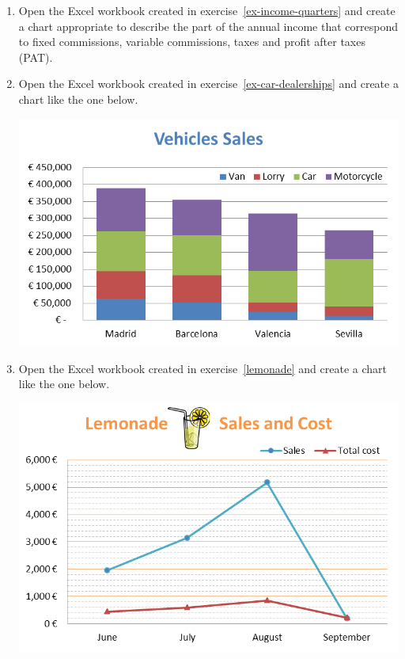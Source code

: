 \begin{enumerate}[leftmargin=*,resume]
\item Open the Excel workbook created in exercise~\ref{ex-income-quarters} and create a chart appropriate to describe
the part of the annual income that correspond to fixed commissions, variable commissions, taxes and profit after taxes
(PAT).

\item Open the Excel workbook created in exercise~\ref{ex-car-dealerships} and create a chart like the one below.
\begin{center}
\includegraphics[scale=0.8]{img/car-dealerships}
\end{center}

\item Open the Excel workbook created in exercise~\ref{lemonade} and create a chart like the one below.
\begin{center}
\includegraphics[scale=0.8]{img/lemonade}
\end{center}


\end{enumerate}
